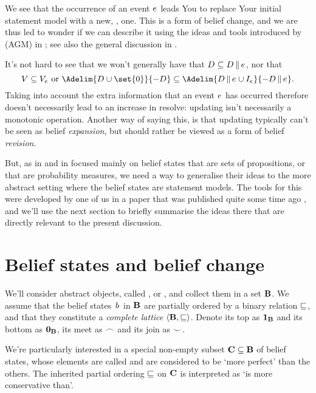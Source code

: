 \documentclass[preprint]{isipta2025}
\begin{document}
We see that the occurrence of an event \(e_{}\) leads You to replace Your initial statement model with a new, , one.
This is a form of belief change, and we are thus led to wonder if we can describe it using the ideas and tools introduced by \citeauthor{alchourron1985} (AGM) in \cite{alchourron1985}; see also the general discussion in \cite{gardenfors1988}.

It's not hard to see that we won't generally have that \(\desirset\subseteq\desirset\altcondon\eventopt\), nor that
\begin{equation*}
\bgM\subseteq\eventbgM
\text{ or }
\Adelim{\desirset\cup\set{0}}{-\desirset}\subseteq\Adelim{\desirset\altcondon\eventopt\cup\eventindifset}{-\desirset\altcondon\eventopt}.
\end{equation*}
Taking into account the extra information that an event \(e_{}\) has occurred therefore doesn't necessarily lead to an increase in resolve: updating isn't necessarily a monotonic operation.
Another way of saying this, is that updating typically can't be seen as belief \emph{expansion}, but should rather be viewed as a form of belief \emph{revision}.

But, as \citeauthor{alchourron1985} in \cite{alchourron1985} and \citeauthor{gardenfors1988} in \cite{gardenfors1988} focused mainly on belief states that are sets of propositions, or that are probability measures, we need a way to generalise their ideas to the more abstract setting where the belief states are statement models.
The tools for this were developed by one of us in a paper that was published quite some time ago \cite{cooman2003a}, and we'll use the next section to briefly summarise the ideas there that are directly relevant to the present discussion.

\section{Belief states and belief change}\label{sec::belief:change}
We'll consider abstract objects, called , or , and collect them in a set \(\mathbf{B}\).
We assume that the belief states~\(b_{}\) in \(\mathbf{B}\) are partially ordered by a binary relation \(\sqsubseteq\), and that they constitute a \emph{complete lattice} \(\langle\mathbf{B},\sqsubseteq\rangle\).
Denote its top as \(\mathbf{1}_{\mathbf{B}}\) and its bottom as \(\mathbf{0}_{\mathbf{B}}\), its meet as \(\frown\) and its join as \(\smile\).

We're particularly interested in a special non-empty subset \(\mathbf{C}\subseteq\mathbf{B}\) of belief states, whose elements are called  and are considered to be `more perfect' than the others.
The inherited partial ordering \(\sqsubseteq\) on \(\mathbf{C}\) is interpreted as `is more conservative than'.
\end{document}
